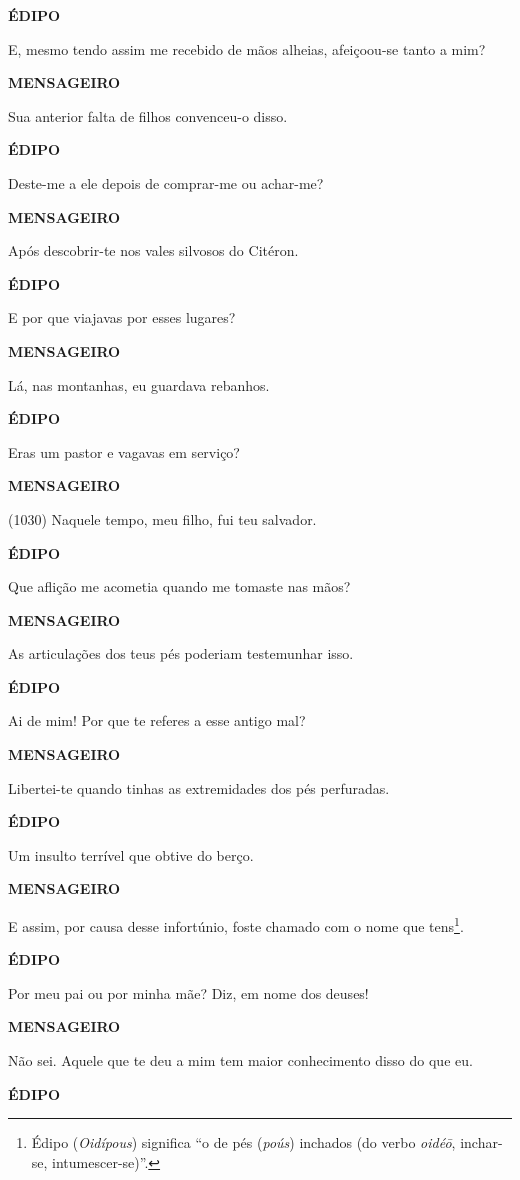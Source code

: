 \textbf{ÉDIPO}

E, mesmo tendo assim me recebido de mãos alheias, afeiçoou-se tanto a
mim?

\textbf{MENSAGEIRO}

Sua anterior falta de filhos convenceu-o disso.

\textbf{ÉDIPO}

Deste-me a ele depois de comprar-me ou achar-me?

\textbf{MENSAGEIRO}

Após descobrir-te nos vales silvosos do Citéron.

\textbf{ÉDIPO}

E por que viajavas por esses lugares?

\textbf{MENSAGEIRO}

Lá, nas montanhas, eu guardava rebanhos.

\textbf{ÉDIPO}

Eras um pastor e vagavas em serviço?

\textbf{MENSAGEIRO}

(1030) Naquele tempo, meu filho, fui teu salvador.

\textbf{ÉDIPO}

Que aflição me acometia quando me tomaste nas mãos?

\textbf{MENSAGEIRO}

As articulações dos teus pés poderiam testemunhar isso.

\textbf{ÉDIPO}

Ai de mim! Por que te referes a esse antigo mal?

\textbf{MENSAGEIRO}

Libertei-te quando tinhas as extremidades dos pés perfuradas.

\textbf{ÉDIPO}

Um insulto terrível que obtive do berço.

\textbf{MENSAGEIRO}

E assim, por causa desse infortúnio, foste chamado com o nome que
tens\footnote{Édipo (\emph{Oidípous}) significa ``o de pés (\emph{poús})
  inchados (do verbo \emph{oidéō}, inchar-se, intumescer-se)''.}.

\textbf{ÉDIPO}

Por meu pai ou por minha mãe? Diz, em nome dos deuses!

\textbf{MENSAGEIRO}

Não sei. Aquele que te deu a mim tem maior conhecimento disso do que eu.

\textbf{ÉDIPO}

